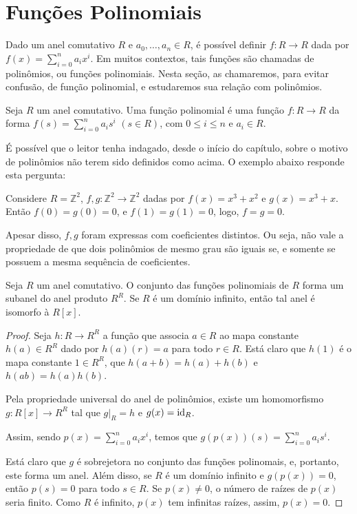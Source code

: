 \section{Funções Polinomiais}
Dado um anel comutativo $R$ e $a_0, \dots, a_n\in R$, é possível definir $f:R\rightarrow R$ dada por $f(x)=\sum_{i=0}^n a_ix^i$.
Em muitos contextos, tais funções são chamadas de polinômios, ou funções polinomiais.
Nesta seção, as chamaremos, para evitar confusão, de função polinomial, e estudaremos sua relação com polinômios.

\begin{definition}
Seja $R$ um anel comutativo.
Uma função polinomial é uma função $f:R\rightarrow R$ da forma $f(s)=\sum_{i=0}^n a_is^i$ $(s \in R)$, com $0\leq i\leq n$ e $a_i\in R$.
\end{definition}

É possível que o leitor tenha indagado, desde o início do capítulo, sobre o motivo de polinômios não terem sido definidos como acima.
O exemplo abaixo responde esta pergunta:

\begin{exemplo}
Considere $R=\mathbb Z^2$, $f, g:\mathbb Z^2\rightarrow \mathbb Z^2$ dadas por $f(x)=x^3+x^2$ e $g(x)=x^3+x$. Então $f(0)=g(0)=0$, e $f(1)=g(1)=0$, logo, $f=g=0$.

Apesar disso, $f, g$ foram expressas com coeficientes distintos. Ou seja, não vale a propriedade de que dois polinômios de mesmo grau são iguais se, e somente se possuem a mesma sequência de coeficientes.
\end{exemplo}

\begin{prop}
Seja $R$ um anel comutativo. O conjunto das funções polinomiais de $R$ forma um subanel do anel produto $R^R$.
Se $R$ é um domínio infinito, então tal anel é isomorfo à $R[x]$.
\end{prop}

\begin{proof}
    Seja $h:R\rightarrow R^R$ a função que associa $a \in R$ ao mapa constante $h(a)\in R^R$ dado por $h(a)(r)=a$ para todo $r \in R$.
    Está claro que $h(1)$ é o mapa constante $1 \in R^R$, que $h(a+b)=h(a)+h(b)$ e $h(ab)=h(a)h(b)$.

    Pela propriedade universal do anel de polinômios, existe um homomorfismo $g:R[x]\rightarrow R^R$ tal que $g|_{R}=h$ e $g(x)=\operatorname{id}_R$.
    
    Assim, sendo $p(x)=\sum_{i=0}^n a_ix^i$, temos que $g(p(x))(s)=\sum_{i=0}^n a_is^i$.

    Está claro que $g$ é sobrejetora no conjunto das funções polinomais, e, portanto, este forma um anel. Além disso, se $R$ é um domínio infinito e $g(p(x))=0$, então $p(s)=0$ para todo $s \in R$.
    Se $p(x)\neq 0$, o número de raízes de $p(x)$ seria finito. Como $R$ é infinito, $p(x)$ tem infinitas raízes, assim, $p(x)=0$.
\end{proof}

